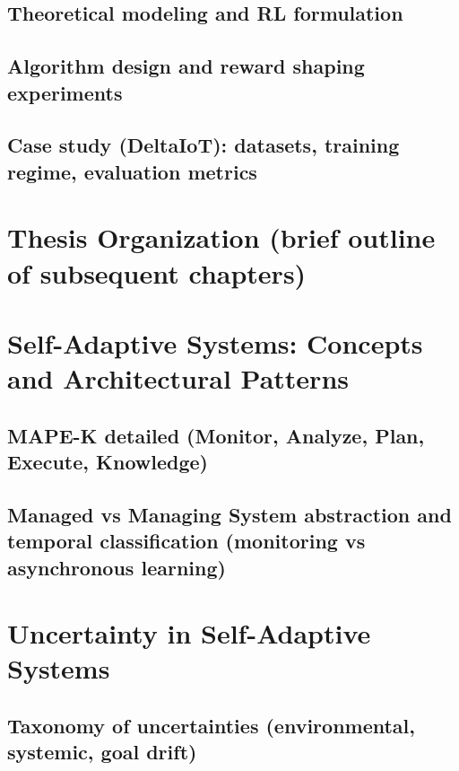 \documentclass[11pt,a4paper]{article}
\begin{document}
\subsection{Theoretical modeling and RL formulation}
\subsection{Algorithm design and reward shaping experiments}
\subsection{Case study (DeltaIoT): datasets, training regime, evaluation metrics}

\section{Thesis Organization (brief outline of subsequent chapters)}

\newpage


\setcounter{section}{0}
\renewcommand{\thesection}{2.\arabic{section}}
\renewcommand{\thesubsection}{2.\arabic{section}.\arabic{subsection}}
\renewcommand{\thesubsubsection}{2.\arabic{section}.\arabic{subsection}.\arabic{subsubsection}}

\section{Self-Adaptive Systems: Concepts and Architectural Patterns}
\subsection{MAPE-K detailed (Monitor, Analyze, Plan, Execute, Knowledge)}
\subsection{Managed vs Managing System abstraction and temporal classification (monitoring vs asynchronous learning)}

\section{Uncertainty in Self-Adaptive Systems}
\subsection{Taxonomy of uncertainties (environmental, systemic, goal drift)}
\end{document}
